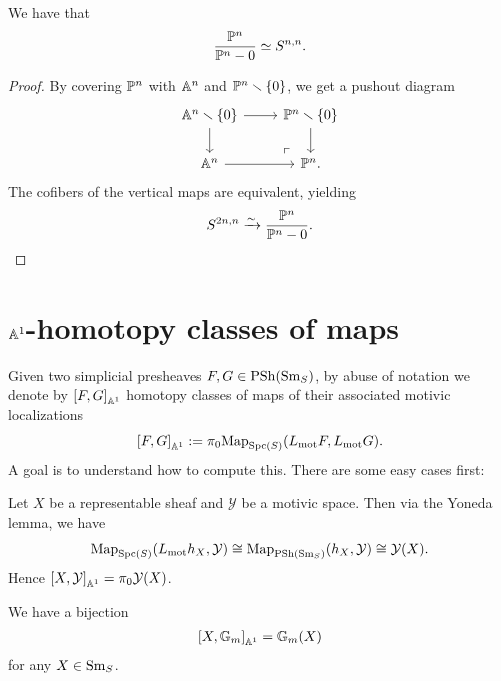 \documentclass[11pt,openany]{book}
\renewcommand{\Pre}{\mathrm{PSh}}
\begin{document}
\begin{proposition} We have that
\begin{align*}
    \frac{\P^n}{\P^n-0}\simeq S^{n,n}.
\end{align*}
\end{proposition}
\begin{proof} By covering $\P^n$ with $\A^n$ and $\P^n\minus\left\{ 0 \right\}$, we get a pushout diagram
\[ \begin{tikzcd}
    \A^n\minus \left\{ 0 \right\}\rar\dar & \P^n\minus\left\{ 0 \right\}\dar\\
    \A^n\rar & \P^n.\po
\end{tikzcd} \]
The cofibers of the vertical maps are equivalent, yielding
\begin{align*}
    S^{2n,n} \xto{\sim} \frac{\P^n}{\P^n-0}.
\end{align*}
\end{proof}



\section{\texorpdfstring{$\A^1$}{A\^{}1}-homotopy classes of maps}

Given two simplicial presheaves $F,G \in \PSh(\Sm_S)$, by abuse of notation we denote by $\left[ F,G \right]_{\A^1}$ homotopy classes of maps of their associated motivic localizations
\begin{align*}
    \left[ F,G \right]_{\A^1} := \pi_0 \Map_{\Spc(S)} (L_\mot F, L_\mot G).
\end{align*}
%
A goal is to understand how to compute this. There are some easy cases first:

\begin{example} Let $X$ be a representable sheaf and $\mathcal{Y}$ be a motivic space. Then via the Yoneda lemma, we have
\begin{align*}
    \Map_{\Spc(S)}(L_\mot h_X, \mathcal{Y}) \cong \Map_{\Pre(\Sm_S)} (h_X, \mathcal{Y}) \cong \mathcal{Y}(X).
\end{align*}
Hence $\left[ X,\mathcal{Y} \right]_{\A^1} = \pi_0 \mathcal{Y}(X)$.
\end{example}

\begin{example} We have a bijection
\begin{align*}
    \left[ X, \mathbb{G}_m \right]_{\A^1} = \mathbb{G}_m(X)
\end{align*}
for any $X\in \Sm_S$.
\end{example}
\end{document}
